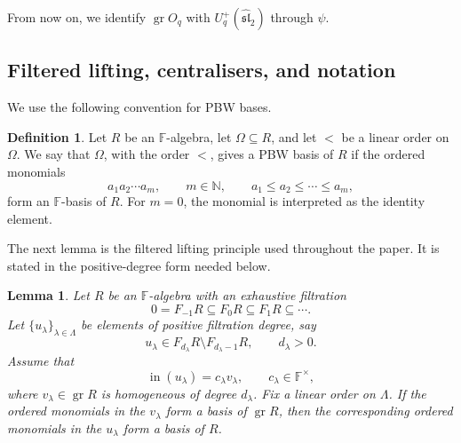 \documentclass[11pt]{extarticle}
\newtheorem{lemma}[theorem]{Lemma}
\theoremstyle{definition}
\newtheorem{definition}[theorem]{Definition}
\theoremstyle{remark}
\numberwithin{equation}{section}
\newcommand{\F}{\mathbb F}
\newcommand{\N}{\mathbb N}
\newcommand{\Oq}{O_q}
\newcommand{\Uplus}{U_q^+(\widehat{\mathfrak{sl}}_2)}
\newcommand{\gr}{\operatorname{gr}}
\newcommand{\init}{\operatorname{in}}
\begin{document}
From now on, we identify \(\gr\Oq\) with \(\Uplus\) through \(\psi\).

\subsection{Filtered lifting, centralisers, and notation}

We use the following convention for PBW bases.

\begin{definition}
Let \(R\) be an \(\F\)-algebra, let \(\Omega\subseteq R\), and let \(<\) be
a linear order on \(\Omega\).  We say that \(\Omega\), with the order \(<\),
gives a PBW basis of \(R\) if the ordered monomials
\[
        a_1a_2\cdots a_m,
        \qquad
        m\in\N,\qquad
        a_1\leq a_2\leq\cdots\leq a_m,
\]
form an \(\F\)-basis of \(R\).  For \(m=0\), the monomial is interpreted as
the identity element.
\end{definition}

The next lemma is the filtered lifting principle used throughout the paper.
It is stated in the positive-degree form needed below.

\begin{lemma}
\label{lem:filtered-lifting}
Let \(R\) be an \(\F\)-algebra with an exhaustive filtration
\[
        0=F_{-1}R\subseteq F_0R\subseteq F_1R\subseteq\cdots .
\]
Let \(\{u_\lambda\}_{\lambda\in\Lambda}\) be elements of positive filtration
degree, say
\[
        u_\lambda\in F_{d_\lambda}R\setminus F_{d_\lambda-1}R,
        \qquad d_\lambda>0.
\]
Assume that
\[
        \init(u_\lambda)=c_\lambda v_\lambda,
        \qquad c_\lambda\in\F^\times,
\]
where \(v_\lambda\in\gr R\) is homogeneous of degree \(d_\lambda\).  Fix a
linear order on \(\Lambda\).  If the ordered monomials in the
\(v_\lambda\) form a basis of \(\gr R\), then the corresponding ordered
monomials in the \(u_\lambda\) form a basis of \(R\).
\end{lemma}
\end{document}
